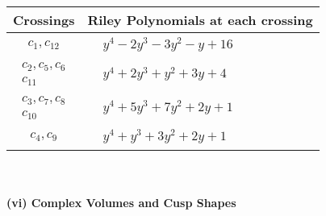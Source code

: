 \documentclass[1p]{elsarticle_modified}
\theoremstyle{definition}
\begin{document}
\begin{tabular}{m{50pt}|m{274pt}}
Crossings & \hspace{64pt}Riley Polynomials at each crossing \\
\hline $$\begin{aligned}c_{1},c_{12}\end{aligned}$$&$\begin{aligned}
&y^4-2 y^3-3 y^2- y+16
\end{aligned}$\\
\hline $$\begin{aligned}c_{2},c_{5},c_{6}\\c_{11}\end{aligned}$$&$\begin{aligned}
&y^4+2 y^3+y^2+3 y+4
\end{aligned}$\\
\hline $$\begin{aligned}c_{3},c_{7},c_{8}\\c_{10}\end{aligned}$$&$\begin{aligned}
&y^4+5 y^3+7 y^2+2 y+1
\end{aligned}$\\
\hline $$\begin{aligned}c_{4},c_{9}\end{aligned}$$&$\begin{aligned}
&y^4+y^3+3 y^2+2 y+1
\end{aligned}$\\
\hline
\end{tabular}\\~\\
\newpage\flushleft \textbf{(vi) Complex Volumes and Cusp Shapes}
\end{document}
